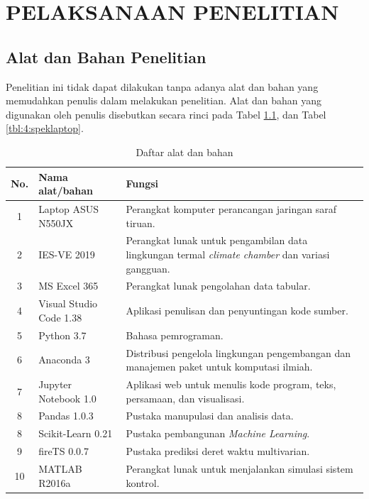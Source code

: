 \chapter{PELAKSANAAN PENELITIAN}
\label{pelaksanaan-penelitian}

\section{Alat dan Bahan Penelitian}
Penelitian ini tidak dapat dilakukan tanpa adanya alat dan bahan yang memudahkan penulis dalam melakukan penelitian. Alat dan bahan yang digunakan oleh penulis disebutkan secara rinci pada Tabel \ref{tbl:4:alatbahan}, dan Tabel \ref{tbl:4:speklaptop}.

\begin{table}[!h]
	\caption{Daftar alat dan bahan}
	\label{tbl:4:alatbahan}
	\centering
	\begin{tabular}{|c|p{4.5cm}|p{9.5cm}|}
		\hline
		No. & Nama alat/bahan & Fungsi \\
		\hline
		1 & Laptop ASUS N550JX & Perangkat komputer perancangan jaringan saraf tiruan. \\
		\hline
		2 & IES-VE 2019 & Perangkat lunak untuk pengambilan data lingkungan termal \textit{climate chamber} dan variasi gangguan. \\
		\hline
		3 & MS Excel 365 & Perangkat lunak pengolahan data tabular. \\
		\hline
		4 & Visual Studio Code 1.38 & Aplikasi penulisan dan penyuntingan kode sumber. \\
		\hline
		5 & Python 3.7 & Bahasa pemrograman. \\
		\hline
		6 & Anaconda 3 & Distribusi pengelola lingkungan pengembangan dan manajemen paket untuk komputasi ilmiah. \\
		\hline
		7 & Jupyter Notebook 1.0 & Aplikasi web untuk menulis kode program, teks, persamaan, dan visualisasi. \\
		\hline
		8 & Pandas 1.0.3 & Pustaka manupulasi dan analisis data. \\
		\hline
		8 & Scikit-Learn 0.21 & Pustaka pembangunan \textit{Machine Learning}. \\
		\hline
		9 & fireTS 0.0.7 & Pustaka prediksi deret waktu multivarian. \\
		\hline
		10 & MATLAB R2016a & Perangkat lunak untuk menjalankan simulasi sistem kontrol. \\
		\hline
	\end{tabular}
\end{table}

